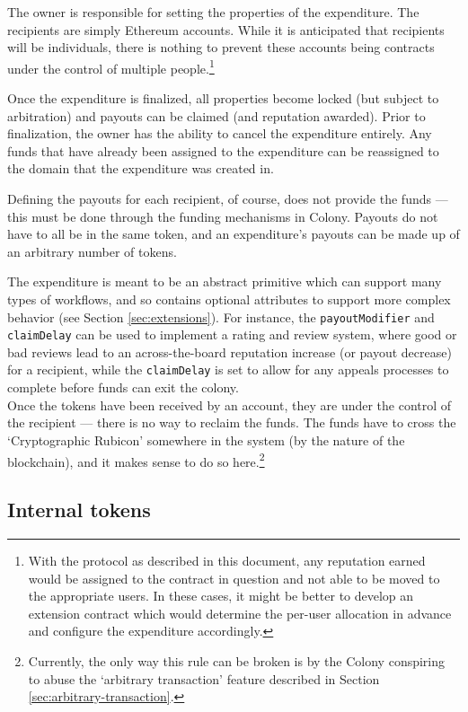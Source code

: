 The owner is responsible for setting the properties of the expenditure. The recipients are simply Ethereum accounts. While it is anticipated that recipients will be individuals, there is nothing to prevent these accounts being contracts under the control of multiple people.\footnote{With the protocol as described in this document, any reputation earned would be assigned to the contract in question and not able to be moved to the appropriate users. In these cases, it might be better to develop an extension contract which would determine the per-user allocation in advance and configure the expenditure accordingly.}

Once the expenditure is finalized, all properties become locked (but subject to arbitration) and payouts can be claimed (and reputation awarded). Prior to finalization, the owner has the ability to cancel the expenditure entirely. Any funds that have already been assigned to the expenditure can be reassigned to the domain that the expenditure was created in.

Defining the payouts for each recipient, of course, does not provide the funds --- this must be done through the funding mechanisms in Colony. Payouts do not have to all be in the same token, and an expenditure's payouts can be made up of an arbitrary number of tokens.

The expenditure is meant to be an abstract primitive which can support many types of workflows, and so contains optional attributes to support more complex behavior (see Section \ref{sec:extensions}). For instance, the \texttt{payoutModifier} and \texttt{claimDelay} can be used to implement a rating and review system, where good or bad reviews lead to an across-the-board reputation increase (or payout decrease) for a recipient, while the \texttt{claimDelay} is set to allow for any appeals processes to complete before funds can exit the colony. \\

Once the tokens have been received by an account, they are under the control of the recipient --- there is no way to reclaim the funds. The funds have to cross the `Cryptographic Rubicon' somewhere in the system (by the nature of the blockchain), and it makes sense to do so here.\footnote{Currently, the only way this rule can be broken is by the Colony conspiring to abuse the `arbitrary transaction' feature described in Section \ref{sec:arbitrary-transaction}.}

\subsection{Internal tokens}\label{sec:colony-tokens}

